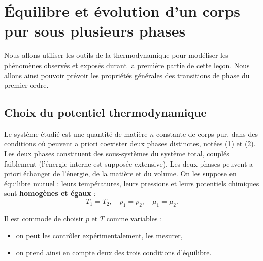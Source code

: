\documentclass[11pt,a4paper]{report}
\begin{document}
\newpage
\section{Équilibre et évolution d'un corps pur sous plusieurs phases}

Nous allons utiliser les outils de la thermodynamique pour modéliser les phénomènes observés et exposés durant la première partie de cette leçon. Nous allons ainsi pouvoir prévoir les propriétés générales des transitions de phase du premier ordre.

\subsection{Choix du potentiel thermodynamique}

Le système étudié est une quantité de matière $n$ constante de corps pur, dans des conditions où peuvent a priori coexister deux phases distinctes, notées (1) et (2). Les deux phases constituent des sous-systèmes du système total, couplés faiblement (l'énergie interne est supposée extensive). Les deux phases peuvent a priori échanger de l'énergie, de la matière et du volume. On les suppose en équilibre mutuel : leurs températures, leurs pressions et leurs potentiels chimiques sont \textbf{homogènes et égaux} :
\begin{equation}
	T_1 = T_2, \quad p_1 = p_2, \quad \mu_1 = \mu_2.
\end{equation}

 Il est commode de choisir $p$ et $T$ comme variables :
\begin{itemize}
	\item on peut les contrôler expérimentalement, les mesurer,
	\item on prend ainsi en compte deux des trois conditions d'équilibre.\\
\end{itemize}
\end{document}
